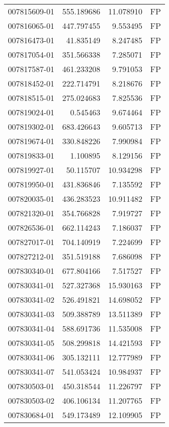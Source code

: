 \begin{tabular}{lrrl}
007815609-01 &  555.189686 &    11.078910 &   FP \\
007816065-01 &  447.797455 &     9.553495 &   FP \\
007816473-01 &   41.835149 &     8.247485 &   FP \\
007817054-01 &  351.566338 &     7.285071 &   FP \\
007817587-01 &  461.233208 &     9.791053 &   FP \\
007818452-01 &  222.714791 &     8.218676 &   FP \\
007818515-01 &  275.024683 &     7.825536 &   FP \\
007819024-01 &    0.545463 &     9.674464 &   FP \\
007819302-01 &  683.426643 &     9.605713 &   FP \\
007819674-01 &  330.848226 &     7.990984 &   FP \\
007819833-01 &    1.100895 &     8.129156 &   FP \\
007819927-01 &   50.115707 &    10.934298 &   FP \\
007819950-01 &  431.836846 &     7.135592 &   FP \\
007820035-01 &  436.283523 &    10.911482 &   FP \\
007821320-01 &  354.766828 &     7.919727 &   FP \\
007826536-01 &  662.114243 &     7.186037 &   FP \\
007827017-01 &  704.140919 &     7.224699 &   FP \\
007827212-01 &  351.519188 &     7.686098 &   FP \\
007830340-01 &  677.804166 &     7.517527 &   FP \\
007830341-01 &  527.327368 &    15.930163 &   FP \\
007830341-02 &  526.491821 &    14.698052 &   FP \\
007830341-03 &  509.388789 &    13.511389 &   FP \\
007830341-04 &  588.691736 &    11.535008 &   FP \\
007830341-05 &  508.299818 &    14.421593 &   FP \\
007830341-06 &  305.132111 &    12.777989 &   FP \\
007830341-07 &  541.053424 &    10.984937 &   FP \\
007830503-01 &  450.318544 &    11.226797 &   FP \\
007830503-02 &  406.106134 &    11.207765 &   FP \\
007830684-01 &  549.173489 &    12.109905 &   FP \\

\end{tabular}
